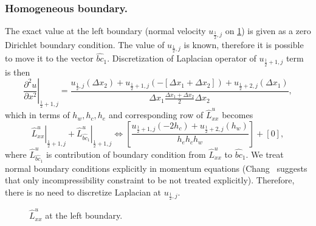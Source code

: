 \documentclass{article}
\numberwithin{equation}{section}
\begin{document}
\subsubsection{Homogeneous boundary.}\label{sec:laplacian-left}
The exact value at the left boundary (normal velocity $u_{\frac{1}{2},j}$ on \cref{fig:luxx-left}) is given as a zero Dirichlet boundary condition. The value of $u_{\frac{1}{2},j}$ is known, therefore it is possible to move it to the vector $\hat{bc}_1$. Discretization of Laplacian operator of $u_{\frac{1}{2}+1,j}$ term is then
\begin{equation}\label{eqn:laplacian-discretization-u-left-deltax}
\left.\frac{\partial^2 u}{\partial x^2}\right|_{\frac{1}{2}+1,j}=
\frac{
	u_{\frac{1}{2},j}\left(\Delta x_2\right)
	+u_{\frac{1}{2}+1,j}\left(-[\Delta x_1 + \Delta x_2]\right)
	+u_{\frac{1}{2}+2,j}\left(\Delta x_1\right)}
	{\Delta x_1 \frac{\Delta x_1+\Delta x_2}{2} \Delta x_2}
	,
\end{equation}
which in terms of $h_w,h_c,h_e$ and corresponding row of $\hat{L}_{xx}^u$ becomes
\begin{equation}\label{eqn:laplacian-discretization-u-left}
\left.\hat{L}_{xx}^u\right|_{\frac{1}{2}+1,j}+\left.\hat{L}^u_{\hat{bc}_1}\right|_{\frac{1}{2}+1,j}\iff
	\left[\frac{
		u_{\frac{1}{2}+1,j}\left(-2h_c\right)
		+u_{\frac{1}{2}+2,j}\left(h_w\right)
	}
	{h_e h_c h_w}\right]
	+\left[0\right],
\end{equation}
where $\hat{L}^u_{\hat{bc}_1}$ is contribution of boundary condition from $\hat{L}^u_{xx}$ to $\hat{bc}_1$. We treat normal boundary conditions explicitly in momentum equations (Chang~\cite{Chang:2002} suggests that only incompressibility constraint to be not treated explicitly). Therefore, there is no need to discretize Laplacian at $u_{\frac{1}{2},j}$. 

\begin{figure}[H] %
  \caption{$\hat{L}^u_{xx}$ at the left boundary.}\label{fig:luxx-left}
\end{figure}
\end{document}
